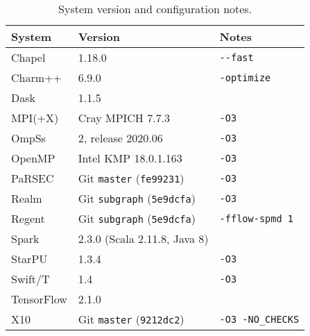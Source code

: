 \begin{table}[t]
\small
\begin{tabular}{@{} l | l | l @{}}
System & Version & Notes \\
\hline
Chapel & 1.18.0 & {\lstinline!--fast!} \\
Charm++ & 6.9.0 & {\lstinline!-optimize!} \\
Dask & 1.1.5 & \\
MPI(+X) & Cray MPICH 7.7.3 & {\lstinline!-O3!} \\
OmpSs & 2, release 2020.06 & {\lstinline!-O3!} \\
OpenMP & Intel KMP 18.0.1.163 & {\lstinline!-O3!} \\
PaRSEC & Git {\lstinline!master!} (\lstinline!fe99231!) & {\lstinline!-O3!} \\
Realm & Git {\lstinline!subgraph!} (\lstinline!5e9dcfa!) & {\lstinline!-O3!} \\
Regent & Git {\lstinline!subgraph!} (\lstinline!5e9dcfa!) & {\lstinline!-fflow-spmd 1!} \\
Spark & 2.3.0 (Scala 2.11.8, Java 8) & \\
StarPU & 1.3.4 & {\lstinline!-O3!} \\
Swift/T & 1.4 & {\lstinline!-O3!} \\
TensorFlow & 2.1.0 & \\
X10 & Git {\lstinline!master!} (\lstinline!9212dc2!) & {\lstinline!-O3 -NO_CHECKS!}
\end{tabular}

\caption{System version and configuration notes.\label{tab:flags}}
\vspace{-0.5cm}
\end{table}
